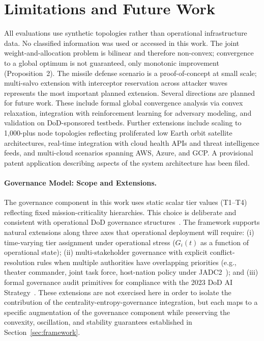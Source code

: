 \documentclass[runningheads]{llncs}
\begin{document}
\section{Limitations and Future Work}
\label{sec:limitations}

All evaluations use synthetic topologies rather than operational infrastructure data. No classified information was used or accessed in this work. The joint weight-and-allocation problem is bilinear and therefore non-convex; convergence to a global optimum is not guaranteed, only monotonic improvement (Proposition~2). The missile defense scenario is a proof-of-concept at small scale; multi-salvo extension with interceptor reservation across attacker waves represents the most important planned extension. Several directions are planned for future work. These include formal global convergence analysis via convex relaxation, integration with reinforcement learning for adversary modeling, and validation on DoD-sponsored testbeds. Further extensions include scaling to 1{,}000-plus node topologies reflecting proliferated low Earth orbit satellite architectures, real-time integration with cloud health APIs and threat intelligence feeds, and multi-cloud scenarios spanning AWS, Azure, and GCP. A provisional patent application describing aspects of the system architecture has been filed.

\paragraph{Governance Model: Scope and Extensions.} The governance component in this work uses static scalar tier values (T1--T4) reflecting fixed mission-criticality hierarchies. This choice is deliberate and consistent with operational DoD governance structures~\cite{dod_ai,nds2022}. The framework supports natural extensions along three axes that operational deployment will require: (i) time-varying tier assignment under operational stress ($G_i(t)$ as a function of operational state); (ii) multi-stakeholder governance with explicit conflict-resolution rules when multiple authorities have overlapping priorities (e.g., theater commander, joint task force, host-nation policy under JADC2~\cite{jadc2}); and (iii) formal governance audit primitives for compliance with the 2023 DoD AI Strategy~\cite{dod_ai}. These extensions are not exercised here in order to isolate the contribution of the centrality-entropy-governance integration, but each maps to a specific augmentation of the governance component while preserving the convexity, oscillation, and stability guarantees established in Section~\ref{sec:framework}.
\end{document}
